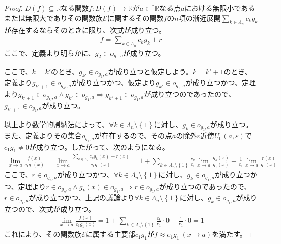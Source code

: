 \documentclass[dvipdfmx]{jsarticle}
\begin{document}
\begin{proof}
$D(f) \subseteq \mathbb{R}$なる関数$f:D(f) \rightarrow \mathbb{R}$が$a \in{}^{*}\mathbb{R}$なる点$a$における無限小であるまたは無限大でありその関数族$\mathcal{E}$に関するその関数$f$の$n$項の漸近展開$\sum_{k \in \varLambda_{n}} {c_{k}g_{k}}$が存在するならそのときに限り、次式が成り立つ。
\begin{align*}
f = \sum_{k \in \varLambda_{n}} {c_{k}g_{k}} + r
\end{align*}
ここで、定義より明らかに、$g_{2} \in o_{g_{1},a}$が成り立つ。\par
ここで、$k = k'$のとき、$g_{k'} \in o_{g_{1},a}$が成り立つと仮定しよう。$k = k' + 1$のとき、定義より$g_{k' + 1} \in o_{g_{k'},a}$が成り立つかつ、仮定より$g_{k'} \in o_{g_{1},a}$が成り立つかつ、定理より$g_{k' + 1} \in o_{g_{k'},a} \land g_{k'} \in o_{g_{1},a} \Rightarrow g_{k' + 1} \in o_{g_{1},a}$が成り立つのであったので、$g_{k' + 1} \in o_{g_{1},a}$が成り立つ。\par
以上より数学的帰納法によって、$\forall k \in \varLambda_{n} \setminus \left\{ 1 \right\}$に対し、$g_{k} \in o_{g_{1},a}$が成り立つ。また、定義よりその集合$o_{g_{1},a}$が存在するので、その点$a$の除外$\varepsilon$近傍$U_{0}(a,\varepsilon)$で$c_{1}g_{1} \neq 0$が成り立つ。したがって、次のようになる。
\begin{align*}
\lim_{x \rightarrow a}\frac{f(x)}{c_{1}g_{1}(x)} = \lim_{x \rightarrow a}\frac{\sum_{k \in \varLambda_{n}} {c_{k}g_{k}(x)} + r(x)}{c_{1}g_{1}(x)} = 1 + \sum_{k \in \varLambda_{n} \setminus \left\{ 1 \right\}} {\frac{c_{k}}{c_{1}}\lim_{x \rightarrow a}\frac{g_{k}(x)}{g_{1}(x)}} + \frac{1}{c_{1}}\lim_{x \rightarrow a}\frac{r(x)}{g_{1}(x)}
\end{align*}
ここで、$r \in o_{g_{n},a}$が成り立つかつ、$\forall k \in \varLambda_{n} \setminus \left\{ 1 \right\}$に対し、$g_{k} \in o_{g_{1},a}$が成り立つかつ、定理より$r \in o_{g_{n},a} \land g_{k}(x) \in o_{g_{1},a} \Rightarrow r \in o_{g_{1},a}$が成り立つのであったので、$r \in o_{g_{1},a}$が成り立つかつ、上記の議論より$\forall k \in \varLambda_{n} \setminus \left\{ 1 \right\}$に対し、$g_{k} \in o_{g_{1},a}$が成り立つので、次式が成り立つ。
\begin{align*}
\lim_{x \rightarrow a}\frac{f(x)}{c_{1}g_{1}(x)} = 1 + \sum_{k \in \varLambda_{n} \setminus \left\{ 1 \right\}} {\frac{c_{k}}{c_{1}} \cdot 0} + \frac{1}{c_{1}} \cdot 0 = 1
\end{align*}
これにより、その関数族$\mathcal{E}$に属する主要部$c_{1}g_{1}$が$f \approx c_{1}g_{1}\ (x \rightarrow a)$を満たす。
\end{proof}
\end{document}
